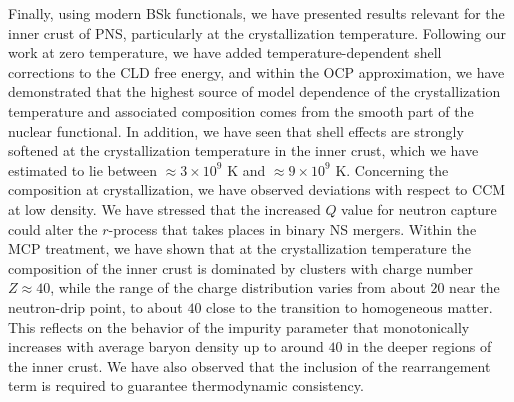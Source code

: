 Finally, using modern BSk functionals, we have presented results relevant for 
the inner crust of PNS, particularly at the crystallization temperature.
Following our work at zero temperature, we have added temperature-dependent 
shell corrections to the CLD free energy, and within the OCP approximation, we 
have demonstrated that the highest source of model dependence of the 
crystallization temperature and associated composition comes from the smooth 
part of the nuclear functional. In addition, we have seen that shell 
effects are strongly softened at the crystallization temperature in the inner 
crust, which we have estimated to lie between $\approx 3\times 10^9$ K and 
$\approx 9\times 10^9$ K. 
Concerning the composition at crystallization, we have observed deviations with 
respect to CCM at low density. We have stressed that the increased $Q$ value
for neutron capture could alter the $r$-process that takes places in binary NS 
mergers.
Within the MCP treatment, we have shown that at the crystallization temperature
the composition of the inner crust is dominated by clusters with charge number
$Z\approx 40$, while the range of the charge distribution varies from about 
$20$ near the neutron-drip point, to about $40$ close to the transition to
homogeneous matter.
This reflects on the behavior of the impurity parameter that monotonically 
increases with average baryon density up to around $40$ in the deeper regions 
of the inner crust.
We have also observed that the inclusion of the rearrangement term is required 
to guarantee thermodynamic consistency.
